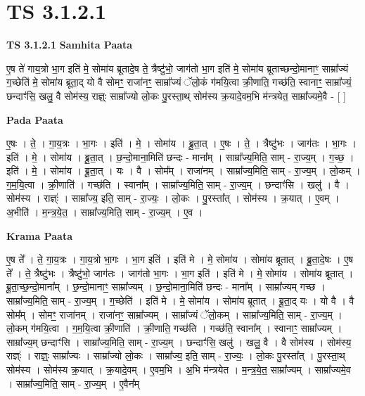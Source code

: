 \documentclass[17pt]{extarticle}
\begin{document}
\section{ TS 3.1.2.1 }

\textbf{TS 3.1.2.1 } \newline
\textbf{Samhita Paata} \newline

ए॒ष ते॑ गाय॒त्रो भा॒ग इति॑ मे॒ सोमा॑य ब्रूतादे॒ष ते॒ त्रैष्टु॑भो॒ जाग॑तो भा॒ग इति॑ मे॒ सोमा॑य ब्रूताच्छन्दो॒मानाꣳ॒॒ साम्रा᳚ज्यं ग॒च्छेति॑ मे॒ सोमा॑य ब्रूता॒द् यो वै सोमꣳ॒॒ राजा॑नꣳ॒॒ साम्रा᳚ज्यं ॅलो॒कं ग॑मयि॒त्वा क्री॒णाति॒ गच्छ॑ति॒ स्वानाꣳ॒॒ साम्रा᳚ज्यं॒ छन्दाꣳ॑सि॒ खलु॒ वै सोम॑स्य॒ राज्ञ्ः॒ साम्रा᳚ज्यो लो॒कः पु॒रस्ता॒थ् सोम॑स्य क्र॒यादे॒वम॒भि म॑न्त्रयेत॒ साम्रा᳚ज्यमे॒वै - [  ] \newline

\textbf{Pada Paata} \newline

ए॒षः । ते॒ । गा॒य॒त्रः । भा॒गः । इति॑ । मे॒ । सोमा॑य । ब्रू॒ता॒त् । ए॒षः । ते॒ । त्रैष्टु॑भः । जाग॑तः । भा॒गः । इति॑ । मे॒ । सोमा॑य । ब्रू॒ता॒त् । छ॒न्दो॒माना॒मिति॑ छन्दः - माना᳚म् । साम्रा᳚ज्य॒मिति॒ साम् - रा॒ज्य॒म् । ग॒च्छ॒ । इति॑ । मे॒ । सोमा॑य । ब्रू॒ता॒त् । यः । वै । सोम᳚म् । राजा॑नम् । साम्रा᳚ज्य॒मिति॒ साम् - रा॒ज्य॒म् । लो॒कम् । ग॒म॒यि॒त्वा । क्री॒णाति॑ । गच्छ॑ति । स्वाना᳚म् । साम्रा᳚ज्य॒मिति॒ साम् - रा॒ज्य॒म् । छन्दाꣳ॑सि । खलु॑ । वै । सोम॑स्य । राज्ञ्ः॑ । साम्रा᳚ज्य॒ इति॒ साम् - रा॒ज्यः॒ । लो॒कः । पु॒रस्ता᳚त् । सोम॑स्य । क्र॒यात् । ए॒वम् । अ॒भीति॑ । म॒न्त्र॒ये॒त॒ । साम्रा᳚ज्य॒मिति॒ साम् - रा॒ज्य॒म् । ए॒व ।  \newline


\textbf{Krama Paata} \newline

ए॒ष ते᳚ । ते॒ गा॒य॒त्रः । गा॒य॒त्रो भा॒गः । भा॒ग इति॑ । इति॑ मे । मे॒ 
सोमा॑य । सोमा॑य ब्रूतात् । ब्रू॒ता॒दे॒षः । ए॒ष ते᳚ । 
ते॒ त्रैष्टु॑भः । त्रैष्टु॑भो॒ जाग॑तः । जाग॑तो भा॒गः । 
भा॒ग इति॑ । इति॑ मे । मे॒ सोमा॑य । सोमा॑य ब्रूतात् । ब्रू॒ता॒च्छ॒न्दो॒माना᳚म् । छ॒न्दो॒मानाꣳ॒॒ साम्रा᳚ज्यम् । छ॒न्दो॒माना॒मिति॑ छन्दः - माना᳚म् । साम्रा᳚ज्यम् गच्छ । साम्रा᳚ज्य॒मिति॒ साम् - रा॒ज्य॒म् । ग॒च्छेति॑ । इति॑ मे । मे॒ सोमा॑य । सोमा॑य ब्रूतात् । ब्रू॒ता॒द् यः । यो वै । वै सोम᳚म् । 
सोमꣳ॒॒ राजा॑नम् । राजा॑नꣳ॒॒ साम्रा᳚ज्यम् । साम्रा᳚ज्यं ॅलो॒कम् । साम्रा᳚ज्य॒मिति॒ साम् - रा॒ज्य॒म् । लो॒कम् ग॑मयि॒त्वा । ग॒म॒यि॒त्वा क्री॒णाति॑ । क्री॒णाति॒ गच्छ॑ति । गच्छ॑ति॒ स्वाना᳚म् । स्वानाꣳ॒॒ साम्रा᳚ज्यम् । साम्रा᳚ज्य॒म् छन्दाꣳ॑सि । साम्रा᳚ज्य॒मिति॒ साम् - रा॒ज्य॒म् । छन्दाꣳ॑सि॒ खलु॑ । खलु॒ वै । वै सोम॑स्य । सोम॑स्य॒ राज्ञ्ः॑ । राज्ञ्ः॒ साम्रा᳚ज्यः । साम्रा᳚ज्यो लो॒कः । साम्रा᳚ज्य॒ इति॒ साम् - रा॒ज्यः॒ । लो॒कः पु॒रस्ता᳚त् । पु॒रस्ता॒थ् सोम॑स्य । सोम॑स्य क्र॒यात् । क्र॒यादे॒वम् । ए॒वम॒भि । 
अ॒भि म॑न्त्रयेत । म॒न्त्र॒ये॒त॒ साम्रा᳚ज्यम् । साम्रा᳚ज्यमे॒व । साम्रा᳚ज्य॒मिति॒ साम् - रा॒ज्य॒म् । ए॒वैन᳚म् \newline
\end{document}
